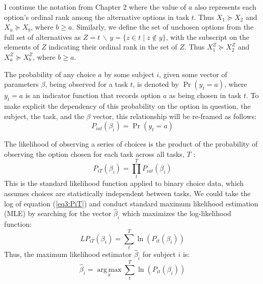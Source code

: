 \documentclass[../main.tex]{subfiles}
\begin{document}
I continue the notation from Chapter 2 where the value of $a$ also represents each option's ordinal rank among the alternative options in task $t$.
Thus $X_1 \succcurlyeq X_2$ and $X_a \succcurlyeq X_b$, where $b \geq a$.
Similarly, we define the set of unchosen options from the full set of alternatives as $Z = t \,\backslash\, y = \{z \in t \;|\; z \notin y \}$, with the subscript on the elements of $Z$ indicating their ordinal rank in the set of $Z$.
Thus $X_1^Z \succcurlyeq X_2^Z$ and $X_a^Z \succcurlyeq X_b^Z$, where $b \geq a$.

The probability of any choice $a$ by some subject $i$, given some vector of parameters $\beta$, being observed for a task $t$, is denoted by $\Pr( y_t = a)$, where $y_t = a$ is an indicator function that records option $a$ as being chosen in task $t$.
To make explicit the dependency of this probability on the option in question, the subject, the task, and the $\beta$ vector, this relationship will be re-framed as follows:
\begin{equation}
	\label{eq3:Piat}
	P_{iat}(\beta_i) = \Pr(y_t = a)
\end{equation}

The likelihood of observing a series of choices is the product of the probability of observing the option chosen for each task across all tasks, $T$ :
\begin{equation}
	\label{eq3:PiT}
	P_{iT}(\beta_i) =  \prod_{t}^{T} P_{iat}(\beta_i)
\end{equation}
\noindent This is the standard likelihood function applied to binary choice data, which assumes choices are statistically independent between tasks.
We could take the log of equation (\ref{eq3:PiT}) and conduct standard maximum likelihood estimation (MLE) by searching for the vector $\hat{\beta}_i$ which maximizes the log-likelihood function:
\begin{equation}
	\label{eq3:LPiT}
	\mathit{LP}_{iT}(\beta_i) = \sum_{t}^{T} \ln \left( P_{it}(\beta_i) \right)
\end{equation}
\noindent Thus, the maximum likelihood estimator $\hat{\beta}_i$ for subject $i$ is:
\begin{equation}
	\label{eq3:Bn}
	\hat{\beta}_i = \underset{x}{\operatorname{arg\,max}}\sum_t^T \ln \left( P_{it}(\beta_i) \right)
\end{equation}
\end{document}
